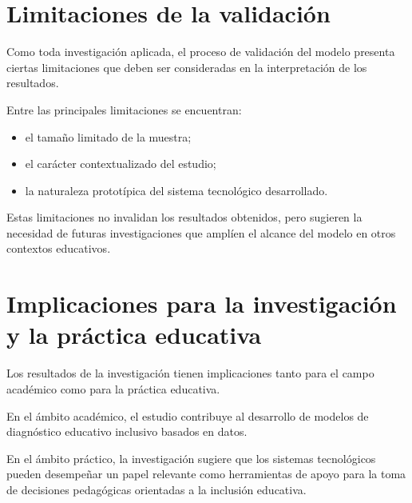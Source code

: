 \begin{refsection}
\section{Limitaciones de la validación}

Como toda investigación aplicada, el proceso de validación del modelo presenta ciertas limitaciones que deben ser consideradas en la interpretación de los resultados.

Entre las principales limitaciones se encuentran:

\begin{itemize}
\item el tamaño limitado de la muestra;
\item el carácter contextualizado del estudio;
\item la naturaleza prototípica del sistema tecnológico desarrollado.
\end{itemize}

Estas limitaciones no invalidan los resultados obtenidos, pero sugieren la necesidad de futuras investigaciones que amplíen el alcance del modelo en otros contextos educativos.

\section{Implicaciones para la investigación y la práctica educativa}

Los resultados de la investigación tienen implicaciones tanto para el campo académico como para la práctica educativa.

En el ámbito académico, el estudio contribuye al desarrollo de modelos de diagnóstico educativo inclusivo basados en datos.

En el ámbito práctico, la investigación sugiere que los sistemas tecnológicos pueden desempeñar un papel relevante como herramientas de apoyo para la toma de decisiones pedagógicas orientadas a la inclusión educativa.

\printbibliography[heading=subbibliography,title={Referencias (Capítulo VI)}]

\end{refsection}